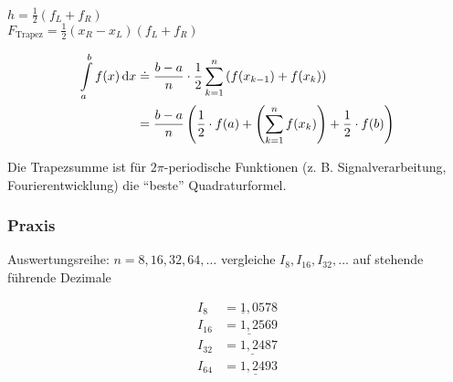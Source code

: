 \begin{enumerate}
	$h = \frac 1 2 (f_L + f_R)$\\
	$F_\text{Trapez}  = \frac 1 2 (x_R - x_L) (f_L + f_R)$
	
	
	\begin{definition}[Trapezregel]
	\begin{align*}
		\int\limits_a^b f(x) \,\mathrm d x &
		\mathrel{\dot{=}} \frac{b-a}{n}\cdot \frac 1 2 \sum_{k=1}^n \left( f(x_{k-1}) + f(x_k) \right) \\
		&= \frac{b-a}{n} \left(\frac 1 2 \cdot f(a) + \left( \sum_{k=1}^n f(x_k) \right) + \frac 1 2 \cdot f(b) \right) \\
	\end{align*}
	\end{definition}
	
	\begin{note}
		Die Trapezsumme ist für $2 \pi$-periodische Funktionen (z. B. Signalverarbeitung, Fourierentwicklung) die "`beste"' Quadraturformel.
	\end{note}


\end{enumerate}

\subsubsection*{Praxis}
Auswertungsreihe: \( n=8, 16, 32, 64, \ldots \) \newline
vergleiche \( I_8,I_{16}, I_{32}, \ldots\) auf stehende führende Dezimale

\begin{example}
\begin{align*}
	I_8 &= \underline{1},0578 \\
	I_{16} &= \underline{1,2}569 \\
	I_{32} &= \underline{1,24}87 \\
	I_{64} &= \underline{1,249}3 \\
\end{align*}
\end{example}